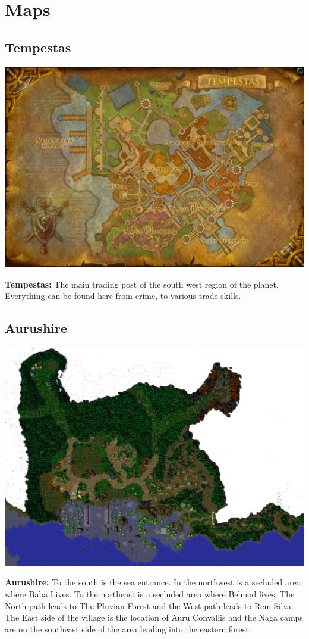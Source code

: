 \onecolumn
\chapter{Maps} \label{maps}

\section{Tempestas}
\begin{center}
	\includegraphics[width=\linewidth]{img/maps/Tempestas.jpg}
	
	{\textbf{Tempestas:} The main trading post of the south west region of the planet. Everything can be found here from crime, to various trade skills.}
\end{center}

\section{Aurushire}
\begin{center}
	\includegraphics[width=\linewidth]{img/maps/Aurushire.png}
	
	{\textbf{Aurushire:} To the south is the sea entrance. In the northwest is a secluded area where Baba Lives. To the northeast is a secluded area where Belmod lives. The North path leads to The Pluvian Forest and the West path leads to Rem Silva. The East side of the village is the location of Auru Convallis and the Naga camps are on the southeast side of the area leading into the eastern forest.}
\end{center}

